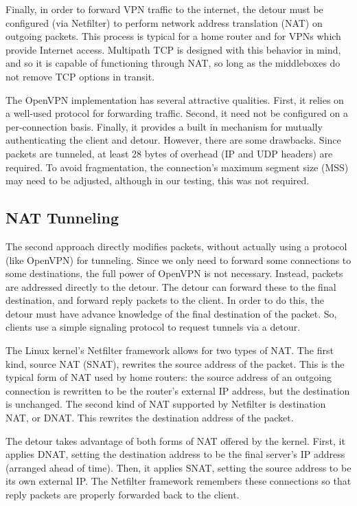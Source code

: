 \documentclass{cwru}
\begin{document}
Finally, in order to forward VPN traffic to the internet, the detour must be
configured (via Netfilter) to perform network address translation (NAT) on
outgoing packets. This process is typical for a home router and for VPNs which
provide Internet access. Multipath TCP is designed with this behavior in mind,
and so it is capable of functioning through NAT, so long as the middleboxes do
not remove TCP options in transit.


The OpenVPN implementation has several attractive qualities. First, it relies on
a well-used protocol for forwarding traffic. Second, it need not be configured
on a per-connection basis. Finally, it provides a built in mechanism for
mutually authenticating the client and detour. However, there are some
drawbacks. Since packets are tunneled, at least 28 bytes of overhead (IP and UDP
headers) are required. To avoid fragmentation, the connection's maximum segment
size (MSS) may need to be adjusted, although in our testing, this was not
required.

\subsection{NAT Tunneling}

The second approach directly modifies packets, without actually using a protocol
(like OpenVPN) for tunneling. Since we only need to forward some connections to
some destinations, the full power of OpenVPN is not necessary. Instead, packets
are addressed directly to the detour. The detour can forward these to the
final destination, and forward reply packets to the client. In order to do this,
the detour must have advance knowledge of the final destination of the packet.
So, clients use a simple signaling protocol to request tunnels via a detour.

The Linux kernel's Netfilter framework allows for two types of NAT. The first
kind, source NAT (SNAT), rewrites the source address of the packet. This is
the typical form of NAT used by home routers: the source address of an outgoing
connection is rewritten to be the router's external IP address, but the
destination is unchanged. The second kind of NAT supported by Netfilter is
destination NAT, or DNAT. This rewrites the destination address of the packet.


The detour takes advantage of both forms of NAT offered by the kernel. First, it
applies DNAT, setting the destination address to be the final server's IP
address (arranged ahead of time). Then, it applies SNAT, setting the source
address to be its own external IP. The Netfilter framework remembers these
connections so that reply packets are properly forwarded back to the client.
\end{document}
